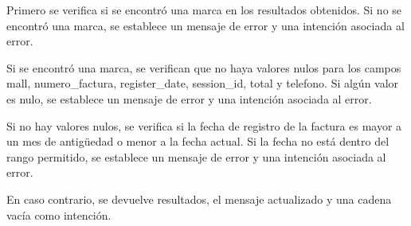 \documentclass{article}
\begin{document}
Primero se verifica si se encontró una marca en los resultados obtenidos. Si no se encontró una marca, se establece un mensaje de error y una intención asociada al error.

Si se encontró una marca, se verifican que no haya valores nulos para los campos mall, numero\_factura, register\_date, session\_id, total y telefono. Si algún valor es nulo, se establece un mensaje de error y una intención asociada al error.

Si no hay valores nulos, se verifica si la fecha de registro de la factura es mayor a un mes de antigüedad o menor a la fecha actual. Si la fecha no está dentro del rango permitido, se establece un mensaje de error y una intención asociada al error.

En caso contrario, se devuelve resultados, el mensaje actualizado y una cadena vacía como intención.
\end{document}
